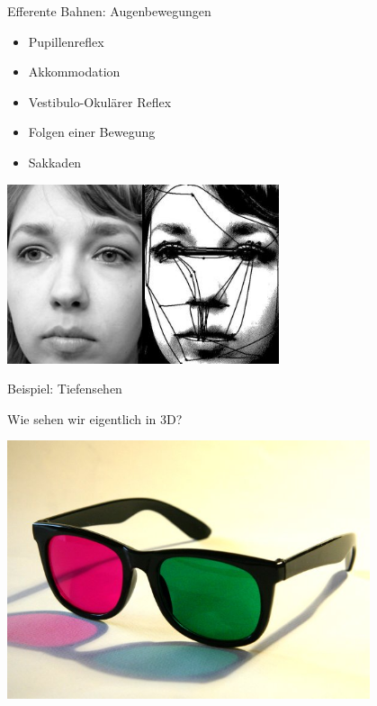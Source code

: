 \documentclass{beamer}
\begin{document}
\begin{frame}{Efferente Bahnen: Augenbewegungen}

\begin{itemize}
    \item 
    Pupillenreflex
    \item
    Akkommodation
    \item
    Vestibulo-Okulärer Reflex 
    \item
    Folgen einer Bewegung
    \item
    Sakkaden
\end{itemize}


\begin{center}
\includegraphics[width=0.6\textwidth]{Szakkad.jpg}
\end{center}

\end{frame}




\begin{frame}{Beispiel: Tiefensehen}

Wie sehen wir eigentlich in 3D? 

\begin{center}
    \includegraphics[width=0.8\textwidth]{Green-Magenta-Glasses.jpg}
\end{center}
    
\end{frame}
\end{document}
